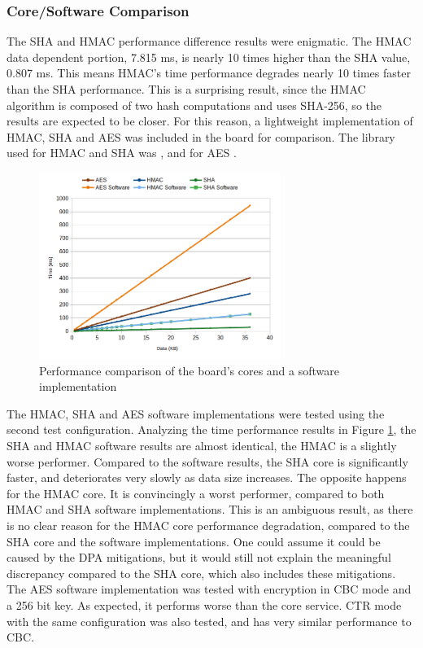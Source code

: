 \subsubsection*{Core/Software Comparison}\label{chap:evaluation:services:software}

The SHA and HMAC performance difference results were enigmatic. The HMAC data dependent portion, 7.815 ms, is nearly 10 times higher than the SHA value, 0.807 ms. This means HMAC's time performance degrades nearly 10 times faster than the SHA performance. This is a surprising result, since the HMAC algorithm is composed of two hash computations and uses SHA-256, so the results are expected to be closer.
For this reason, a lightweight implementation of HMAC, SHA and AES was included in the board for comparison. The library used for HMAC and SHA was \cite{ogayHMAC}, and for AES \cite{tinycrypt}. 

\begin{figure}[h!]
	\centering
	\includegraphics[width=0.7\textwidth]{./Images/software-core-time.png}
	\caption{Performance comparison of the board's cores and a software implementation}
	\label{fig:performance:software-core-time}
\end{figure}

The HMAC, SHA and AES software implementations were tested using the second test configuration.
Analyzing the time performance results in Figure \ref{fig:performance:software-core-time}, the SHA and HMAC software results are almost identical, the HMAC is a slightly worse performer. Compared to the software results, the SHA core is significantly faster, and deteriorates very slowly as data size increases. The opposite happens for the HMAC core. It is convincingly a worst performer, compared to both HMAC and SHA software implementations. 
This is an ambiguous result, as there is no clear reason for the HMAC core performance degradation, compared to the SHA core and the software implementations. One could assume it could be caused by the DPA mitigations, but it would still not explain the meaningful discrepancy compared to the SHA core, which also includes these mitigations.
The AES software implementation was tested with encryption in CBC mode and a 256 bit key. As expected, it performs worse than the core service. CTR mode with the same configuration was also tested, and has very similar performance to CBC.

